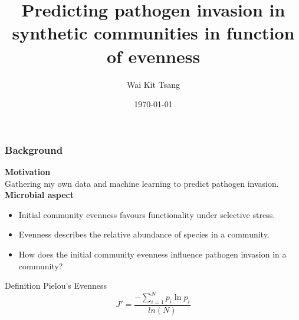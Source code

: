 \documentclass[11pt]{beamer}
\title[Predicting pathogen invasion]{Predicting pathogen invasion in synthetic communities in function of evenness} %
\author{Wai Kit Tsang} %
\institute[LabMET \& KERMIT] %
{

\begin{tabular}{l l }
Promotors: & Prof. dr. ir. Nico Boon \\
		   & Prof. dr. Willem Waegeman \\
Tutor: 	   & Ir. Michiel Stock \\
    	   & Dr. Ramiro V\'ilchez Vargas \\
\end{tabular}

\medskip
Ghent University \\ %
\medskip
\textit{waikit.tsang@ugent.be} %
}
\date{\today} %
\begin{document}
\begin{frame}
\titlepage %
\end{frame}




\begin{frame}
\frametitle{Background}

\textbf{Motivation}\\
Gathering my own data and machine learning to predict pathogen invasion. \\
\medskip
\textbf{Microbial aspect}\\
\begin{itemize}
\item Initial community evenness favours functionality under selective stress. \citep{wittebolle2009initial}
\item Evenness describes the relative abundance of species in a community.
\item How does the initial community evenness influence pathogen invasion in a community?
\end{itemize}

\begin{block}{Definition Pielou's Evenness}
$$
J' = \displaystyle\frac{-\sum_{i = 1}^{N}p_i\ln{p_i}}{ln(N)}
$$
\end{block}

\end{frame}
\end{document}
